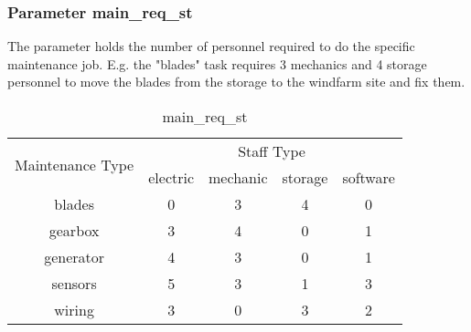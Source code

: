         \subsubsection{Parameter main\_req\_st}
        The parameter holds the number of personnel required to do the specific maintenance job. E.g.
        the "blades" task requires 3 mechanics and 4 storage personnel to move the blades from the
        storage to the windfarm site and fix them. 
        \begin{table}[H]
            \begin{center}
                \begin{tabular}{ |c|c|c|c|c| } 
                \hline
                \multirow{2}{*}{Maintenance Type} &
                \multicolumn{4}{|c|}{Staff Type}\\
                \cline{2-5}
                & electric & mechanic & storage & software \\ 
                \hline
                blades    & 0 & 3 & 4 & 0 \\ 
                gearbox   & 3 & 4 & 0 & 1 \\ 
                generator & 4 & 3 & 0 & 1 \\ 
                sensors   & 5 & 3 & 1 & 3 \\ 
                wiring    & 3 & 0 & 3 & 2 \\ 
                \hline
                \end{tabular}
            \end{center}
        \caption{main\_req\_st} %
        \label{param_main_req_st} %
        \end{table}

